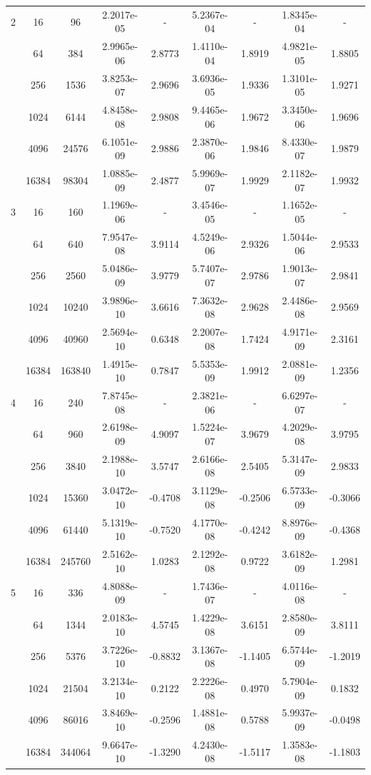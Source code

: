 \begin{longtable}{| c | c c | c c | c c | c c |}
	\hline

	2	& 16 & 96 & 2.2017e-05 & - & 5.2367e-04 & - & 1.8345e-04 & - \\
		& 64 & 384 & 2.9965e-06 & 2.8773 & 1.4110e-04 & 1.8919 & 4.9821e-05 & 1.8805 \\
		& 256 & 1536 & 3.8253e-07 & 2.9696 & 3.6936e-05 & 1.9336 & 1.3101e-05 & 1.9271 \\
		& 1024 & 6144 & 4.8458e-08 & 2.9808 & 9.4465e-06 & 1.9672 & 3.3450e-06 & 1.9696 \\
		& 4096 & 24576 & 6.1051e-09 & 2.9886 & 2.3870e-06 & 1.9846 & 8.4330e-07 & 1.9879 \\
		& 16384 & 98304 & 1.0885e-09 & 2.4877 & 5.9969e-07 & 1.9929 & 2.1182e-07 & 1.9932 \\

	\hline

	3	& 16 & 160 & 1.1969e-06 & - & 3.4546e-05 & - & 1.1652e-05 & - \\
		& 64 & 640 & 7.9547e-08 & 3.9114 & 4.5249e-06 & 2.9326 & 1.5044e-06 & 2.9533 \\
		& 256 & 2560 & 5.0486e-09 & 3.9779 & 5.7407e-07 & 2.9786 & 1.9013e-07 & 2.9841 \\
		& 1024 & 10240 & 3.9896e-10 & 3.6616 & 7.3632e-08 & 2.9628 & 2.4486e-08 & 2.9569 \\
		& 4096 & 40960 & 2.5694e-10 & 0.6348 & 2.2007e-08 & 1.7424 & 4.9171e-09 & 2.3161 \\
		& 16384 & 163840 & 1.4915e-10 & 0.7847 & 5.5353e-09 & 1.9912 & 2.0881e-09 & 1.2356 \\

	\hline

	4	& 16 & 240 & 7.8745e-08 & - & 2.3821e-06 & - & 6.6297e-07 & - \\
		& 64 & 960 & 2.6198e-09 & 4.9097 & 1.5224e-07 & 3.9679 & 4.2029e-08 & 3.9795 \\
		& 256 & 3840 & 2.1988e-10 & 3.5747 & 2.6166e-08 & 2.5405 & 5.3147e-09 & 2.9833 \\
		& 1024 & 15360 & 3.0472e-10 & -0.4708 & 3.1129e-08 & -0.2506 & 6.5733e-09 & -0.3066 \\
		& 4096 & 61440 & 5.1319e-10 & -0.7520 & 4.1770e-08 & -0.4242 & 8.8976e-09 & -0.4368 \\
		& 16384 & 245760 & 2.5162e-10 & 1.0283 & 2.1292e-08 & 0.9722 & 3.6182e-09 & 1.2981 \\

	\hline
    
	5	& 16 & 336 & 4.8088e-09 & - & 1.7436e-07 & - & 4.0116e-08 & - \\
		& 64 & 1344 & 2.0183e-10 & 4.5745 & 1.4229e-08 & 3.6151 & 2.8580e-09 & 3.8111 \\
		& 256 & 5376 & 3.7226e-10 & -0.8832 & 3.1367e-08 & -1.1405 & 6.5744e-09 & -1.2019 \\
		& 1024 & 21504 & 3.2134e-10 & 0.2122 & 2.2226e-08 & 0.4970 & 5.7904e-09 & 0.1832 \\
		& 4096 & 86016 & 3.8469e-10 & -0.2596 & 1.4881e-08 & 0.5788 & 5.9937e-09 & -0.0498 \\
		& 16384 & 344064 & 9.6647e-10 & -1.3290 & 4.2430e-08 & -1.5117 & 1.3583e-08 & -1.1803 \\
	

\end{longtable}
